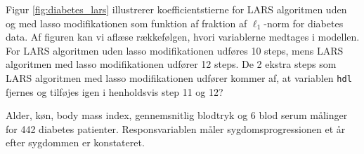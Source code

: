 Figur \ref{fig:diabetes_lars} illustrerer koefficientstierne for LARS algoritmen uden og med lasso modifikationen som funktion af fraktion af \(\ell_1\)-norm for diabetes data.
Af figuren kan vi aflæse rækkefølgen, hvori variablerne medtages i modellen.
For LARS algoritmen uden lasso modifikationen udføres 10 steps, mens LARS algoritmen med lasso modifikationen udfører 12 steps.
De 2 ekstra steps som LARS algoritmen med lasso modifikationen udfører kommer af, at variablen \texttt{hdl} fjernes og tilføjes igen i henholdsvis step 11 og 12?

%
\begin{exmp}

%
Alder, køn, body mass index, gennemsnitlig blodtryk og 6 blod serum målinger for 442 diabetes patienter.
Responsvariablen måler sygdomsprogressionen et år efter sygdommen er konstateret.
\end{exmp}
%
%
%
%
%
